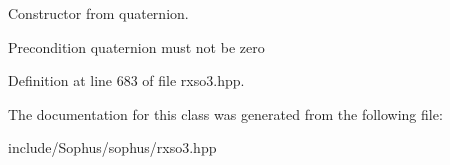 Constructor from quaternion. 

\begin{DoxyPrecond}{Precondition}
quaternion must not be zero 
\end{DoxyPrecond}


Definition at line 683 of file rxso3.\+hpp.



The documentation for this class was generated from the following file\+:\begin{DoxyCompactItemize}
\item 
include/\+Sophus/sophus/rxso3.\+hpp\end{DoxyCompactItemize}
